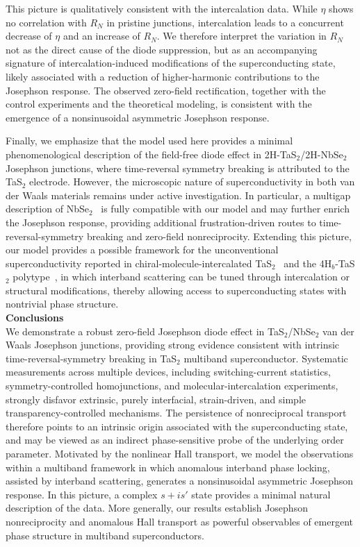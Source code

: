 \documentclass[twocolumn,secnumarabic,amssymb, nobibnotes, aps, prl, superscriptaddress]{revtex4-2}
\begin{document}
This picture is qualitatively consistent with the intercalation data. While $\eta$ shows no correlation with $R_N$ in pristine junctions, intercalation leads to a concurrent decrease of $\eta$ and an increase of $R_N$. We therefore interpret the variation in $R_N$ not as the direct cause of the diode suppression, but as an accompanying signature of intercalation-induced modifications of the superconducting state, likely associated with a reduction of higher-harmonic contributions to the Josephson response. The observed zero-field rectification, together with the control experiments and the theoretical modeling, is consistent with the emergence of a nonsinusoidal asymmetric Josephson response.

Finally, we emphasize that the model used here provides a minimal phenomenological description of the field-free diode effect in 2H-TaS$_2$/2H-NbSe$_2$ Josephson junctions, where time-reversal symmetry breaking is attributed to the TaS$_2$ electrode. However, the microscopic nature of superconductivity in both
van der Waals materials remains under active investigation. In particular, a multigap description of NbSe$_2$~\cite{noat_quasiparticle_2015} is fully compatible with our model and may further enrich the Josephson response, providing additional frustration-driven routes to time-reversal-symmetry breaking and zero-field nonreciprocity. Extending this picture, our model provides a possible framework for the unconventional superconductivity reported in chiral-molecule-intercalated TaS$_2$~\cite{24_chiral} and the 4H$_b$-TaS$_2$ polytype~\cite{chiral4Hb}, in which interband scattering can be tuned through intercalation or structural modifications, thereby allowing access to superconducting states with nontrivial phase structure.\\ 
 
\noindent\large{\textbf{Conclusions}}\normalsize\\
We demonstrate a robust zero-field Josephson diode effect in TaS$_2$/NbSe$_2$ van der Waals Josephson junctions, 
providing strong evidence consistent with intrinsic time-reversal-symmetry breaking in TaS$_2$ multiband superconductor. Systematic measurements across multiple devices, including switching-current statistics, symmetry-controlled homojunctions, 
and molecular-intercalation experiments, strongly disfavor extrinsic, purely interfacial, strain-driven, and simple transparency-controlled mechanisms. 
The persistence of nonreciprocal transport therefore points to an intrinsic origin associated with the superconducting state, and may be viewed as an indirect phase-sensitive probe of the underlying order parameter. Motivated by the nonlinear Hall transport, 
we model the observations within a multiband framework in which anomalous interband phase locking, assisted by interband scattering, 
generates a nonsinusoidal asymmetric Josephson response. In this picture, a complex $s+is'$ state provides a minimal natural description of the data. More generally, our results establish Josephson nonreciprocity and anomalous Hall transport as powerful observables of emergent phase structure in multiband superconductors.
\end{document}
